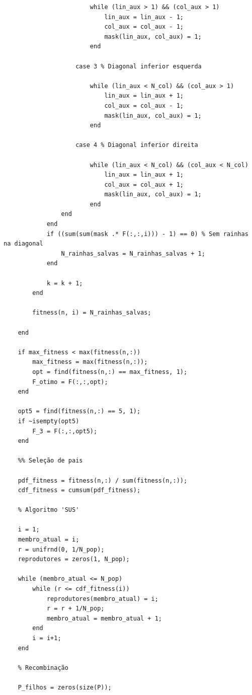 \documentclass{report}
\begin{document}
\begin{lstlisting}
                        while (lin_aux > 1) && (col_aux > 1)
                            lin_aux = lin_aux - 1;
                            col_aux = col_aux - 1;
                            mask(lin_aux, col_aux) = 1;
                        end

                    case 3 % Diagonal inferior esquerda

                        while (lin_aux < N_col) && (col_aux > 1)
                            lin_aux = lin_aux + 1;
                            col_aux = col_aux - 1;
                            mask(lin_aux, col_aux) = 1;
                        end
                    
                    case 4 % Diagonal inferior direita

                        while (lin_aux < N_col) && (col_aux < N_col)
                            lin_aux = lin_aux + 1;
                            col_aux = col_aux + 1;
                            mask(lin_aux, col_aux) = 1;
                        end
                end
            end
            if ((sum(sum(mask .* F(:,:,i))) - 1) == 0) % Sem rainhas na diagonal
                N_rainhas_salvas = N_rainhas_salvas + 1;
            end
            
            k = k + 1;
        end

        fitness(n, i) = N_rainhas_salvas;

    end

    if max_fitness < max(fitness(n,:))
        max_fitness = max(fitness(n,:));
        opt = find(fitness(n,:) == max_fitness, 1);
        F_otimo = F(:,:,opt);
    end

    opt5 = find(fitness(n,:) == 5, 1);
    if ~isempty(opt5)
        F_3 = F(:,:,opt5);
    end

    %% Seleção de pais

    pdf_fitness = fitness(n,:) / sum(fitness(n,:));
    cdf_fitness = cumsum(pdf_fitness);

    % Algoritmo 'SUS'

    i = 1;
    membro_atual = i;
    r = unifrnd(0, 1/N_pop);
    reprodutores = zeros(1, N_pop);

    while (membro_atual <= N_pop)
        while (r <= cdf_fitness(i))
            reprodutores(membro_atual) = i;
            r = r + 1/N_pop;
            membro_atual = membro_atual + 1;
        end
        i = i+1;
    end

    % Recombinação

    P_filhos = zeros(size(P));
    

\end{lstlisting}
\end{document}
